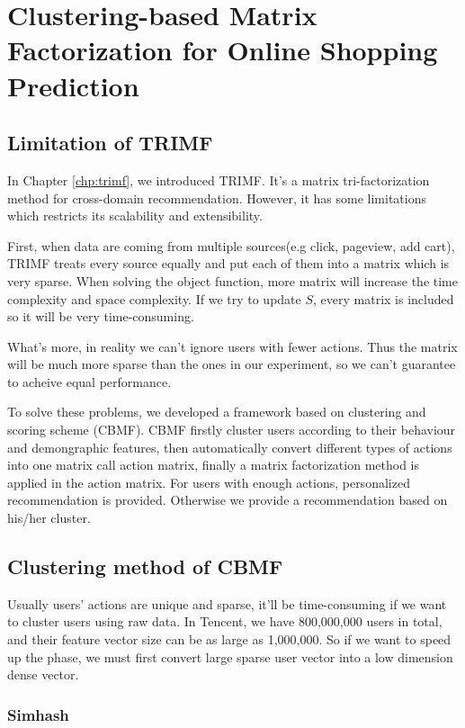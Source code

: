 \chapter{Clustering-based Matrix Factorization for Online Shopping Prediction}
\label{chp:cbmf}
\section{Limitation of TRIMF}
In Chapter \ref{chp:trimf}, we introduced TRIMF. It's a matrix tri-factorization method for cross-domain recommendation. However, it has some limitations which restricts its scalability and extensibility.

First, when data are coming from multiple sources(e.g click, pageview, add cart), TRIMF treats every source equally and put each of them into a matrix which is very sparse. When solving the object function, more matrix will increase the time complexity and space complexity. If we try to update $S$, every matrix is included so it will be very time-consuming.

What's more, in reality we can't ignore users with fewer actions. Thus the matrix will be much more sparse than the ones in our experiment, so we can't guarantee to acheive equal performance.

To solve these problems, we developed a framework based on clustering and scoring scheme (CBMF). CBMF firstly cluster users according to their behaviour and demongraphic features, then automatically convert different types of actions into one matrix call action matrix, finally a matrix factorization method is applied in the action matrix. For users with enough actions, personalized recommendation is provided. Otherwise we provide a recommendation based on his/her cluster.

\section{Clustering method of CBMF}

Usually users' actions are unique and sparse, it'll be time-consuming if we want to cluster users using raw data. In Tencent, we have 800,000,000 users in total, and their feature vector size can be as large as 1,000,000. So if we want to speed up the phase, we must first convert large sparse user vector into a low dimension dense vector.

\subsection{Simhash}

